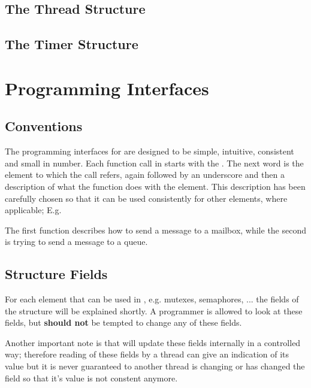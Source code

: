 

\subsection{The Thread Structure}

\subsection{The Timer Structure}

\section{Programming Interfaces}

\subsection{Conventions}

The programming interfaces for \oswald are designed to be simple, intuitive,
consistent and small in number. Each function call in \oswald starts with the
. The next word is the element to which the call refers, again
followed by an underscore and then a description of what the function does
with the element. This description has been carefully chosen so that it can
be used consistently for other elements, where applicable; E.g.



The first function describes how to send a message to a mailbox, while the
second is trying to send a message to a queue.

\subsection{Structure Fields}

For each element that can be used in \oswald, e.g. mutexes, semaphores, ... the
fields of the structure will be explained shortly. A programmer is allowed
to look at these fields, but \textbf{should not} be tempted to change any of
these fields.

Another important note is that \oswald will update these fields internally in
a controlled way; therefore reading of these fields by a thread can give an
indication of its value but it is never guaranteed to another thread is
changing or has changed the field so that it's value is not constent
anymore.

